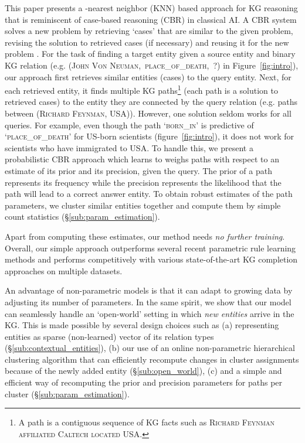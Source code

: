 \documentclass[11pt,a4paper]{article}
\begin{document}
This paper presents a -nearest neighbor (KNN) based approach for KG reasoning that is reminiscent of case-based reasoning (CBR) in classical AI. A CBR system solves a new problem by retrieving `cases' that are similar to the given problem, revising the solution to retrieved cases (if necessary) and reusing it for the new problem \citep[inter-alia]{schank1982dynamic,leake1996cbr}. For the task of finding a target entity given a source entity and binary KG relation (e.g. (\textsc{John Von Neuman},~\textsc{place\_of\_death},~?) in Figure~\ref{fig:intro}), our approach first retrieves  similar entities (cases) to the query entity. Next, for each retrieved entity, it finds multiple KG paths\footnote{A path is a contiguous sequence of KG facts such as  \textsc{Richard Feynman}  \textsc{affiliated}  \textsc{Caltech}  \textsc{located}  \textsc{USA}.} (each path is a solution to retrieved cases) to the entity they are connected by the query relation (e.g. paths between (\textsc{Richard Feynman, USA})). However, one solution seldom works for all queries. For example, even though the path `\textsc{born\_in}' is predictive of `\textsc{place\_of\_death}' for US-born scientists (figure~\ref{fig:intro}), it does not work for scientists who have immigrated to USA. To handle this, we present a probabilistic CBR approach which learns to weighs paths with respect to an estimate of its prior and its precision, given the query. The prior of a path represents its frequency while the precision represents the likelihood that the path will lead to a correct answer entity. To obtain robust estimates of the path parameters, we cluster similar entities together and compute them by simple count statistics (\S\ref{sub:param_estimation}).


Apart from computing these estimates, our method needs \emph{no further training}. Overall, our simple approach outperforms several recent parametric rule learning methods \cite{das2018go,minervini2019differentiable} and performs competitively with various state-of-the-art KG completion approaches \cite{dettmers2018convolutional} on multiple datasets. 

An advantage of non-parametric models is that it can adapt to growing data by adjusting its number of parameters. In the same spirit, we show that our model can seamlessly handle an `open-world' setting in which \emph{new entities} arrive in the KG. This is made possible by several design choices such as (a) representing entities as sparse (non-learned) vector of its relation types (\S\ref{sub:contextual_entities}), (b) our use of an online non-parametric hierarchical clustering algorithm  \cite{monath2019scalable} that can efficiently recompute changes in cluster assignments because of the newly added entity (\S\ref{sub:open_world}), (c) and a simple and efficient way of recomputing the prior and precision parameters for paths per cluster (\S\ref{sub:param_estimation}).
\end{document}
